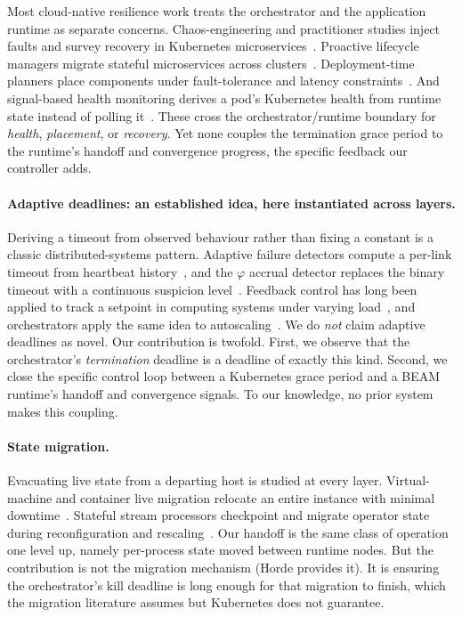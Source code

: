 \documentclass[AMA,Times1COL]{WileyNJDv5}
\begin{document}
Most cloud-native resilience work treats the orchestrator and the application runtime as separate
concerns. Chaos-engineering and practitioner studies inject faults and survey recovery in Kubernetes
microservices~\cite{singh2025istio,souza2024dependable}. Proactive lifecycle managers migrate
stateful microservices across clusters~\cite{meliani2025proactive}. Deployment-time planners place
components under fault-tolerance and latency constraints~\cite{ucc23,gustafsson2025rtilience}. And
signal-based health monitoring derives a pod's Kubernetes health from runtime state instead of
polling it~\cite{roberts2025}. These cross the orchestrator/runtime boundary for \emph{health},
\emph{placement}, or \emph{recovery}. Yet none couples the termination grace period to the runtime's
handoff and convergence progress, the specific feedback our controller adds.

\paragraph{Adaptive deadlines: an established idea, here instantiated across layers.} Deriving a
timeout from observed behaviour rather than fixing a constant is a classic distributed-systems
pattern. Adaptive failure detectors compute a per-link timeout from heartbeat
history~\cite{chen2002qos}, and the $\varphi$ accrual detector replaces the binary timeout with a
continuous suspicion level~\cite{hayashibara2004phi}. Feedback control has long been applied to track
a setpoint in computing systems under varying load~\cite{hellerstein2004feedback}, and orchestrators
apply the same idea to autoscaling~\cite{senjab2023k8s}. We do \emph{not} claim adaptive deadlines as
novel. Our contribution is twofold. First, we observe that the orchestrator's \emph{termination}
deadline is a deadline of exactly this kind. Second, we close the specific control loop between a
Kubernetes grace period and a BEAM runtime's handoff and convergence signals. To our knowledge, no
prior system makes this coupling.

\paragraph{State migration.} Evacuating live state from a departing host is studied at every layer.
Virtual-machine and container live migration relocate an entire instance with minimal
downtime~\cite{clark2005live,nadgowda2017voyager}. Stateful stream processors checkpoint and migrate
operator state during reconfiguration and rescaling~\cite{carbone2015snapshots,carbone2015flink,
hoffmann2019megaphone}. Our handoff is the same class of operation one level up, namely per-process
state moved between runtime nodes. But the contribution is not the migration mechanism (Horde provides
it). It is ensuring the orchestrator's kill deadline is long enough for that migration to finish, which
the migration literature assumes but Kubernetes does not guarantee.
\end{document}
